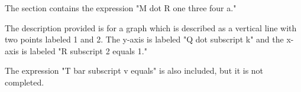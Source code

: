 The section contains the expression "M dot R one three four a."

The description provided is for a graph which is described as a vertical line with two points labeled 1 and 2. The y-axis is labeled "Q dot subscript k" and the x-axis is labeled "R subscript 2 equals 1."

The expression "T bar subscript v equals" is also included, but it is not completed.
